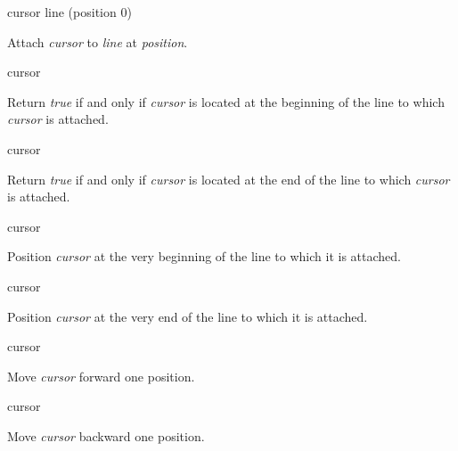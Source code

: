  {cursor line \optional (position 0)}

\vskip 1mm\noindent
Attach \textit{cursor} to \textit{line} at \textit{position}.

 {cursor}

\vskip 1mm\noindent
Return \textit{true} if and only if \textit{cursor} is located at the
beginning of the line to which \textit{cursor} is attached.

 {cursor}

\vskip 1mm\noindent
Return \textit{true} if and only if \textit{cursor} is located at the
end of the line to which \textit{cursor} is attached.

 {cursor}

\vskip 1mm\noindent
Position \textit{cursor} at the very beginning of the line to which it
is attached.

 {cursor}

\vskip 1mm\noindent
Position \textit{cursor} at the very end of the line to which it
is attached.

 {cursor}

\vskip 1mm\noindent
Move \textit{cursor} forward one position.

 {cursor}

\vskip 1mm\noindent
Move \textit{cursor} backward one position.
